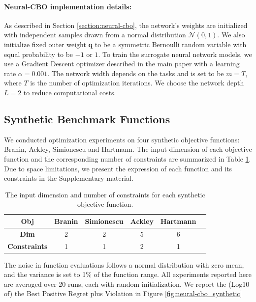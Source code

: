 \paragraph{Neural-CBO implementation details:}
As described in Section \ref{section:neural-cbo}, the network's weights are initialized with independent samples drawn from a normal distribution $\mathcal{N} (0, 1)$. We also initialize fixed outer weight $\mathbf{q}$ to be a symmetric Bernoulli random variable with equal probability to be $-1$ or $1$. To train the surrogate neural network models, we use a Gradient Descent optimizer described in the main paper with a learning rate $\alpha = 0.001$. The network width depends on the tasks and is set to be $m = T$, where $T$ is the number of optimization iterations. We choose the network depth $L=2$ to reduce computational costs. 


% 

  

\subsection{Synthetic Benchmark Functions}
\label{section:neural-cbo_synthetic}
 We conducted optimization experiments on four synthetic objective functions: Branin, Ackley, Simionescu and Hartmann. The input dimension of each objective function and the corresponding number of constraints are summarized in Table \ref{table:synthetic_info}. Due to space limitations, we present the expression of each function and its constraints in the Supplementary material. 
  \begin{table}[h]
  \centering
 \caption{The input dimension and number of constraints for each synthetic objective function.}
 \vspace{0.15in}
\begin{tabular}{|c|c|c|c|c|c|}
\hline
\textbf{Obj}              & Branin & Simionescu & Ackley & Hartmann  \\ \hline
\textbf{Dim}                   & 2   & 2               & 5 & 6                  \\ \hline
\textbf{Constraints}       & 1      & 1              & 2       & 1          \\ \hline
\end{tabular}
\label{table:synthetic_info}
\end{table}
The noise in function evaluations follows a normal distribution with zero mean, and the variance is set to 1\% of the function range. All experiments reported here are averaged over 20 runs, each with random initialization. We report the (Log10 of) the Best Positive Regret plus Violation in Figure \ref{fig:neural-cbo_synthetic}


